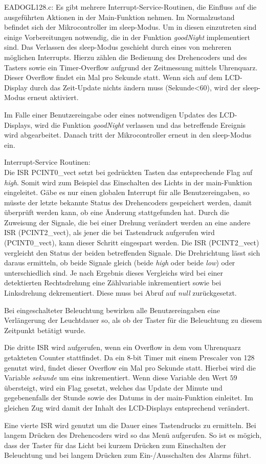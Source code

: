 \documentclass[journal, a4paper]{IEEEtran}
\begin{document}
	EADOGL128.c:
	Es gibt mehrere Interrupt-Service-Routinen, die Einfluss auf die ausgeführten Aktionen in der Main-Funktion nehmen. Im Normalzustand befindet sich der Mikrocontroller im sleep-Modus. Um in diesen einzutreten sind einige Vorbereitungen notwendig, die in der Funktion \emph{goodNight} implementiert sind. Das Verlassen des sleep-Modus geschieht durch eines von mehreren möglichen Interrupts. Hierzu zählen die Bedienung des Drehencoders und des Tasters sowie ein Timer-Overflow aufgrund der Zeitmessung mittels Uhrenquarz. Dieser Overflow findet ein Mal pro Sekunde statt. Wenn sich auf dem LCD-Display durch das Zeit-Update nichts ändern muss (Sekunde<60), wird der sleep-Modus erneut aktiviert. \par
	Im Falle einer Benutzereingabe oder eines notwendigen Updates des LCD-Displays, wird die Funktion \emph{goodNight} verlassen und das betreffende Ereignis wird abgearbeitet. Danach tritt der Mikrocontroller erneut in den sleep-Modus ein.
	
	Interrupt-Service Routinen:\\
	Die ISR PCINT0\_vect setzt bei gedrückten Tasten das entsprechende Flag auf \emph{high}. Somit wird zum Beispiel das Einschalten des Lichts in der main-Funktion eingeleitet.
	Gäbe es nur einen globalen Interrupt für alle Benutzereingaben, so müsste der letzte bekannte Status des Drehencoders gespeichert werden, damit überprüft werden kann, ob eine Änderung stattgefunden hat. Durch die Zuweisung der Signale, die bei einer Drehung verändert werden an eine andere ISR (PCINT2\_vect), als jener die bei Tastendruck aufgerufen wird (PCINT0\_vect), kann dieser Schritt eingespart werden. Die ISR (PCINT2\_vect) vergleicht den Status der beiden betreffenden Signale. Die Drehrichtung lässt sich daraus ermitteln, ob beide Signale gleich (beide \emph{high} oder beide \emph{low}) oder unterschiedlich sind. Je nach Ergebnis dieses Vergleichs wird bei einer detektierten Rechtsdrehung eine Zählvariable inkrementiert sowie bei Linksdrehung dekrementiert. Diese muss bei Abruf auf \emph{null} zurückgesetzt.\par 
	Bei eingeschalteter Beleuchtung bewirken alle Benutzereingaben eine Verlängerung der Leuchtdauer so, als ob der Taster für die Beleuchtung zu diesem Zeitpunkt betätigt wurde.\par
	Die dritte ISR wird aufgerufen, wenn ein Overflow in dem vom Uhrenquarz getakteten Counter stattfindet. Da ein 8-bit Timer mit einem Prescaler von 128 genutzt wird, findet dieser Overflow ein Mal pro Sekunde statt. Hierbei wird die Variable \emph{sekunde} um eins inkrementiert. Wenn diese Variable den Wert $59$ übersteigt, wird ein Flag gesetzt, welches das Update der Minute und gegebenenfalls der Stunde sowie des Datums in der main-Funktion einleitet. Im gleichen Zug wird damit der Inhalt des LCD-Displays entsprechend verändert.\par
	Eine vierte ISR wird genutzt um die Dauer eines Tastendrucks zu ermitteln. Bei langem Drücken des Drehencoders wird so das Menü aufgerufen. So ist es mögich, dass der Taster für das Licht bei kurzem Drücken zum Einschalten der Beleuchtung und bei langem Drücken zum Ein-/Ausschalten des Alarms führt.
	
\end{document}
